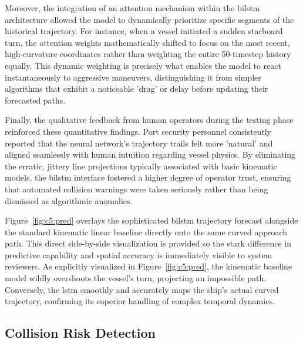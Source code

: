 Moreover, the integration of an attention mechanism within the \gls{bilstm} architecture allowed the model to dynamically prioritize specific segments of the historical trajectory. For instance, when a vessel initiated a sudden starboard turn, the attention weights mathematically shifted to focus on the most recent, high-curvature coordinates rather than weighting the entire 50-timestep history equally. This dynamic weighting is precisely what enables the model to react instantaneously to aggressive maneuvers, distinguishing it from simpler algorithms that exhibit a noticeable 'drag' or delay before updating their forecasted paths.

Finally, the qualitative feedback from human operators during the testing phase reinforced these quantitative findings. Port security personnel consistently reported that the neural network's trajectory trails felt more 'natural' and aligned seamlessly with human intuition regarding vessel physics. By eliminating the erratic, jittery line projections typically associated with basic kinematic models, the \gls{bilstm} interface fostered a higher degree of operator trust, ensuring that automated collision warnings were taken seriously rather than being dismissed as algorithmic anomalies.
\begin{reportfigblock}
Figure~\ref{fig:c5:pred} overlays the sophisticated \gls{bilstm} trajectory forecast alongside the standard kinematic linear baseline directly onto the same curved approach path. This direct side-by-side visualization is provided so the stark difference in predictive capability and spatial accuracy is immediately visible to system reviewers.
As explicitly visualized in Figure~\ref{fig:c5:pred}, the kinematic baseline model wildly overshoots the vessel's turn, projecting an impossible path. Conversely, the \gls{lstm} smoothly and accurately maps the ship's actual curved trajectory, confirming its superior handling of complex temporal dynamics.
\end{reportfigblock}

\subsection{Collision Risk Detection}


